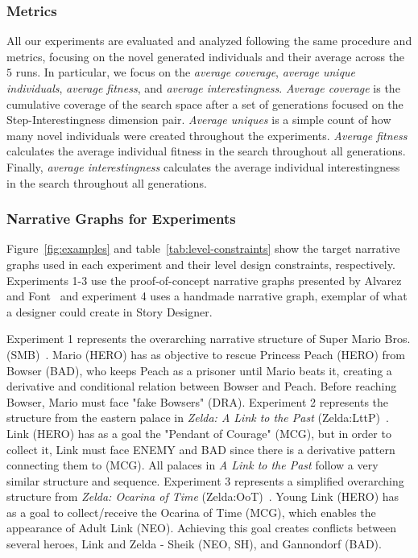 
\subsubsection{Metrics}

All our experiments are evaluated and analyzed following the same procedure and metrics, focusing on the novel generated individuals and their average across the $5$ runs. In particular, we focus on the \textit{average coverage}, \textit{average unique individuals}, \textit{average fitness}, and \textit{average interestingness}. \textit{Average coverage} is the cumulative coverage of the search space after a set of generations focused on the Step-Interestingness dimension pair. \textit{Average uniques} is a simple count of how many novel individuals were created throughout the experiments. \textit{Average fitness} calculates the average individual fitness in the search throughout all generations. Finally, \textit{average interestingness} calculates the average individual interestingness in the search throughout all generations.



\subsubsection{Narrative Graphs for Experiments}

Figure~\ref{fig:examples} and table~\ref{tab:level-constraints} show the target narrative graphs used in each experiment and their level design constraints, respectively. Experiments 1-3 use the proof-of-concept narrative graphs presented by Alvarez and Font~ and experiment 4 uses a handmade narrative graph, exemplar of what a designer could create in Story Designer. 

Experiment 1 represents the overarching narrative structure of Super Mario Bros. (SMB)~. Mario (HERO) has as objective to rescue Princess Peach (HERO) from Bowser (BAD), who keeps Peach as a prisoner until Mario beats it, creating a derivative and conditional relation between Bowser and Peach. Before reaching Bowser, Mario must face "fake Bowsers" (DRA). Experiment 2 represents the structure from the eastern palace in \emph{Zelda: A Link to the Past} (Zelda:LttP)~. Link (HERO) has as a goal the "Pendant of Courage" (MCG), but in order to collect it, Link must face ENEMY and BAD since there is a derivative pattern connecting them to (MCG). All palaces in \textit{A Link to the Past} follow a very similar structure and sequence. Experiment 3 represents a simplified overarching structure from \emph{Zelda: Ocarina of Time} (Zelda:OoT)~. Young Link (HERO) has as a goal to collect/receive the Ocarina of Time (MCG), which enables the appearance of Adult Link (NEO). Achieving this goal creates conflicts between several heroes, Link and Zelda - Sheik (NEO, SH), and Gannondorf (BAD). 

